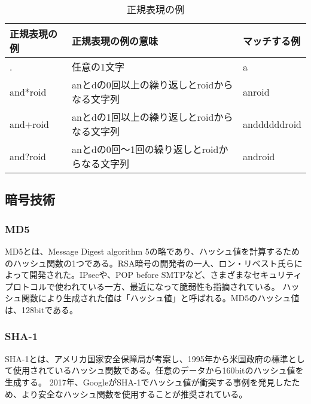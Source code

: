 \begin{table}[t]
\begin{center}
\caption{正規表現の例}
\begin{tabular}{lll} \hline
正規表現の例 & 正規表現の例の意味 & マッチする例 \\ \hline
. & 任意の1文字 & a \\
and$\ast$roid & anとdの0回以上の繰り返しとroidからなる文字列 & anroid \\
and+roid & anとdの1回以上の繰り返しとroidからなる文字列 & anddddddroid \\
and?roid & anとdの0回～1回の繰り返しとroidからなる文字列 & android \\ \hline
\end{tabular}
\label{tb:RegularExpression2}
\end{center}
\end{table}

\subsection{暗号技術}

\subsubsection {MD5}
MD5とは、Message Digest algorithm 5の略であり、ハッシュ値を計算するためのハッシュ関数の1つである。RSA暗号の開発者の一人、ロン・リベスト氏らによって開発された。IPsecや、POP before SMTPなど、さまざまなセキュリティプロトコルで使われている一方、最近になって脆弱性も指摘されている。
ハッシュ関数により生成された値は「ハッシュ値」と呼ばれる。MD5のハッシュ値は、128bitである。

\subsubsection {SHA-1}
SHA-1とは、アメリカ国家安全保障局が考案し、1995年から米国政府の標準として使用されているハッシュ関数である。任意のデータから160bitのハッシュ値を生成する。
2017年、GoogleがSHA-1でハッシュ値が衝突する事例\cite{INTERNET Watch}を発見したため、より安全なハッシュ関数を使用することが推奨されている。


